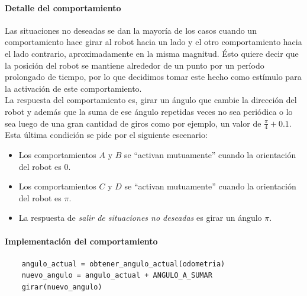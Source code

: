 \paragraph{Detalle del comportamiento}
Las situaciones no deseadas se dan la mayor\'ia de los casos cuando un
comportamiento hace girar al robot hacia un lado y el otro comportamiento hacia
el lado contrario, aproximadamente en la misma magnitud. \'Esto quiere decir
que la posici\'on del robot se mantiene alrededor de un punto por un per\'iodo
prolongado de tiempo, por lo que decidimos tomar este hecho como est\'imulo
para la activaci\'on de este comportamiento.
\\
La respuesta del comportamiento es, girar un \'angulo que cambie la
direcci\'on del robot y adem\'as que la suma de ese \'angulo repetidas veces no
sea peri\'odica o lo sea luego de una gran cantidad de giros como por ejemplo,
un valor de $\frac{\pi}{4}+0.1$.
Esta \'ultima condici\'on se pide por el siguiente escenario:
\begin{itemize}
	\item Los comportamientos $A$ y $B$ se ``activan mutuamente'' cuando la
		orientaci\'on del robot es $0$.
	\item Los comportamientos $C$ y $D$ se ``activan mutuamente'' cuando la
		orientaci\'on del robot es $\pi$.
	\item La respuesta de \emph{salir de situaciones no deseadas} es girar un
		\'angulo $\pi$.
\end{itemize}

\paragraph{Implementaci\'on del comportamiento}
\begin{verbatim}
    angulo_actual = obtener_angulo_actual(odometria)
    nuevo_angulo = angulo_actual + ANGULO_A_SUMAR
    girar(nuevo_angulo)
\end{verbatim}

